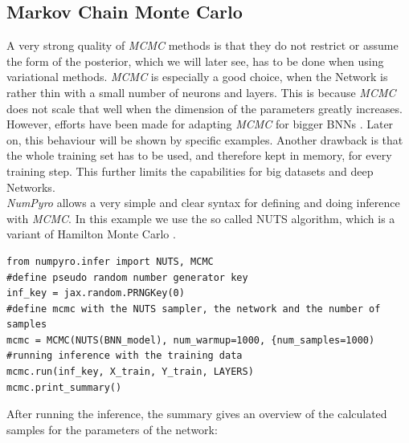 \documentclass{article}
\begin{document}
\subsection{Markov Chain Monte Carlo}
A very strong quality of \textit{MCMC} methods is that they do not restrict or assume the form of the posterior, which we will later see, has to be done when using variational methods. \textit{MCMC} is especially a good choice, when the Network is rather thin with a small number of neurons and layers. This is because \textit{MCMC} does not scale that well when the dimension of the parameters greatly increases. However, efforts have been made for adapting \textit{MCMC} for bigger BNNs \cite{murphy}. Later on, this behaviour will be shown by specific examples. Another drawback is that the whole training set has to be used, and therefore kept in memory, for every training step. This further limits the capabilities for big datasets and deep Networks.\\
\textit{NumPyro} allows a very simple and clear syntax for defining and doing inference with \textit{MCMC}. In this example we use the so called NUTS algorithm, which is a variant of Hamilton Monte Carlo \cite{Brooks_2011, hoffman2011nouturnsampleradaptivelysetting}.
\begin{lstlisting}[caption= {Inference with NUTS},captionpos=t]
from numpyro.infer import NUTS, MCMC
#define pseudo random number generator key
inf_key = jax.random.PRNGKey(0)
#define mcmc with the NUTS sampler, the network and the number of samples
mcmc = MCMC(NUTS(BNN_model), num_warmup=1000, {num_samples=1000)
#running inference with the training data 
mcmc.run(inf_key, X_train, Y_train, LAYERS)
mcmc.print_summary()
\end{lstlisting}
After running the inference, the summary gives an overview of the calculated samples for the parameters of the network:
\end{document}
